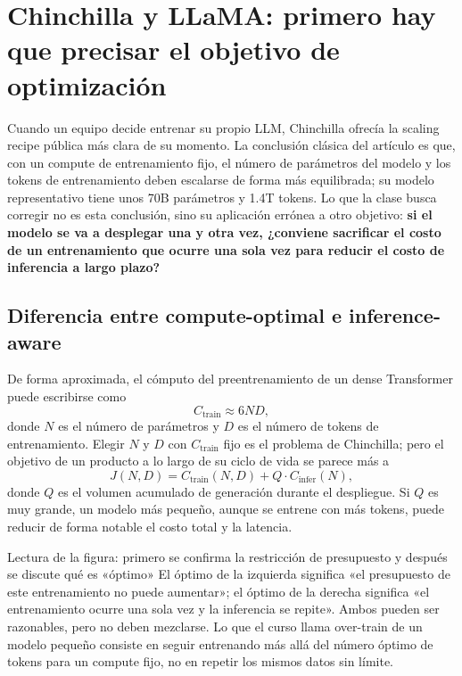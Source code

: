 \section{Chinchilla y LLaMA: primero hay que precisar el objetivo de optimización}

Cuando un equipo decide entrenar su propio LLM, Chinchilla ofrecía la scaling recipe pública más clara de su momento. La conclusión clásica del artículo es que, con un compute de entrenamiento fijo, el número de parámetros del modelo y los tokens de entrenamiento deben escalarse de forma más equilibrada; su modelo representativo tiene unos 70B parámetros y 1.4T tokens. Lo que la clase busca corregir no es esta conclusión, sino su aplicación errónea a otro objetivo: \textbf{si el modelo se va a desplegar una y otra vez, ¿conviene sacrificar el costo de un entrenamiento que ocurre una sola vez para reducir el costo de inferencia a largo plazo?}

\subsection{Diferencia entre compute-optimal e inference-aware}

De forma aproximada, el cómputo del preentrenamiento de un dense Transformer puede escribirse como
\[
C_{\mathrm{train}}\approx 6ND,
\]
donde $N$ es el número de parámetros y $D$ es el número de tokens de entrenamiento. Elegir $N$ y $D$ con $C_{\mathrm{train}}$ fijo es el problema de Chinchilla; pero el objetivo de un producto a lo largo de su ciclo de vida se parece más a
\[
J(N,D)=C_{\mathrm{train}}(N,D)
+Q\cdot C_{\mathrm{infer}}(N),
\]
donde $Q$ es el volumen acumulado de generación durante el despliegue. Si $Q$ es muy grande, un modelo más pequeño, aunque se entrene con más tokens, puede reducir de forma notable el costo total y la latencia.


\begin{knowledgebox}{Lectura de la figura: primero se confirma la restricción de presupuesto y después se discute qué es «óptimo»}
El óptimo de la izquierda significa «el presupuesto de este entrenamiento no puede aumentar»; el óptimo de la derecha significa «el entrenamiento ocurre una sola vez y la inferencia se repite». Ambos pueden ser razonables, pero no deben mezclarse. Lo que el curso llama over-train de un modelo pequeño consiste en seguir entrenando más allá del número óptimo de tokens para un compute fijo, no en repetir los mismos datos sin límite.
\end{knowledgebox}

